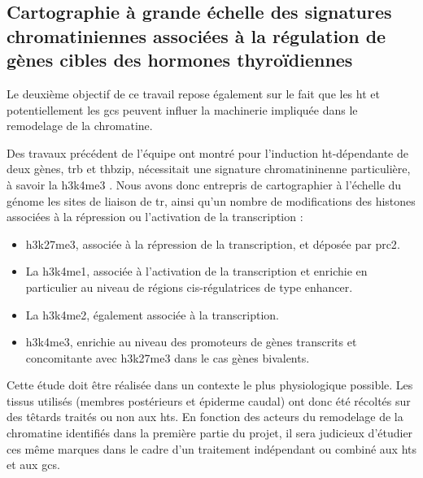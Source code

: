 \subsection{Cartographie à grande échelle des signatures chromatiniennes associées à la régulation de gènes cibles des hormones thyroïdiennes}
Le deuxième objectif de ce travail repose également sur le fait que les \gls{ht} et potentiellement les \glspl{gc} peuvent influer la machinerie impliquée dans le remodelage de la chromatine.



Des travaux précédent de l'équipe ont montré pour l'induction \gls{ht}-dépendante de deux gènes, \gls{trb} et \gls{thbzip}, nécessitait une signature chromatininenne particulière, à savoir la \gls{h3k4me3} \citep{Bilesimo2011}.
Nous avons donc entrepris de cartographier à l'échelle du génome les sites de liaison de \gls{tr}, ainsi qu'un nombre de modifications des histones associées à la répression ou l'activation de la transcription :
\begin{itemize}
\item \gls{h3k27me3}, associée à la répression de la transcription, et déposée par \gls{prc2}.
\item La \gls{h3k4me1}, associée à l'activation de la transcription et enrichie en particulier au niveau de régions cis-régulatrices de type enhancer.
\item La \gls{h3k4me2}, également associée à la transcription.
\item \gls{h3k4me3}, enrichie au niveau des promoteurs de gènes transcrits et concomitante avec \gls{h3k27me3} dans le cas gènes bivalents.
\end{itemize}

Cette étude doit être réalisée dans un contexte le plus physiologique possible.
Les tissus utilisés (membres postérieurs et épiderme caudal) ont donc été récoltés sur des têtards traités ou non aux \glspl{ht}.
En fonction des acteurs du remodelage de la chromatine identifiés dans la première partie du projet, il sera judicieux d'étudier ces même marques dans le cadre d'un traitement indépendant ou combiné aux \glspl{ht} et aux \glspl{gc}. 



